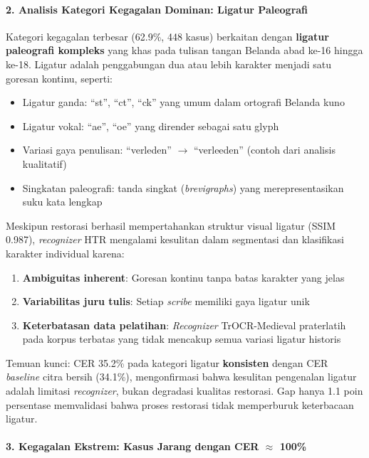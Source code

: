 \documentclass[12pt,a4paper]{article}
\begin{document}
\paragraph{2. Analisis Kategori Kegagalan Dominan: Ligatur Paleografi}

Kategori kegagalan terbesar (62.9\%, 448 kasus) berkaitan dengan \textbf{ligatur paleografi kompleks} yang khas pada tulisan tangan Belanda abad ke-16 hingga ke-18. Ligatur adalah penggabungan dua atau lebih karakter menjadi satu goresan kontinu, seperti:
\begin{itemize}[nosep]
    \item Ligatur ganda: ``st'', ``ct'', ``ck'' yang umum dalam ortografi Belanda kuno
    \item Ligatur vokal: ``ae'', ``oe'' yang dirender sebagai satu glyph
    \item Variasi gaya penulisan: ``verleden'' $\rightarrow$ ``verleeden'' (contoh dari analisis kualitatif)
    \item Singkatan paleografi: tanda singkat (\textit{brevigraphs}) yang merepresentasikan suku kata lengkap
\end{itemize}

Meskipun restorasi berhasil mempertahankan struktur visual ligatur (SSIM 0.987), \textit{recognizer} HTR mengalami kesulitan dalam segmentasi dan klasifikasi karakter individual karena:
\begin{enumerate}[nosep]
    \item \textbf{Ambiguitas inherent}: Goresan kontinu tanpa batas karakter yang jelas
    \item \textbf{Variabilitas juru tulis}: Setiap \textit{scribe} memiliki gaya ligatur unik
    \item \textbf{Keterbatasan data pelatihan}: \textit{Recognizer} TrOCR-Medieval praterlatih pada korpus terbatas yang tidak mencakup semua variasi ligatur historis
\end{enumerate}

Temuan kunci: CER 35.2\% pada kategori ligatur \textbf{konsisten} dengan CER \textit{baseline} citra bersih (34.1\%), mengonfirmasi bahwa kesulitan pengenalan ligatur adalah limitasi \textit{recognizer}, bukan degradasi kualitas restorasi. Gap hanya 1.1 poin persentase memvalidasi bahwa proses restorasi tidak memperburuk keterbacaan ligatur.

\paragraph{3. Kegagalan Ekstrem: Kasus Jarang dengan CER $\approx$ 100\%}
\end{document}
